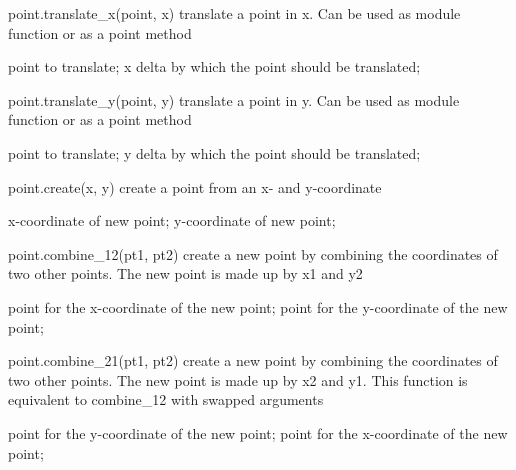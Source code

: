 \begin{APIfunc}{point.translate\_x(point, x)}
    translate a point in x. Can be used as module function or as a point method
    \begin{APIparameters}
            point to translate;
            x delta by which the point should be translated;
    \end{APIparameters}
\end{APIfunc}
\begin{APIfunc}{point.translate\_y(point, y)}
    translate a point in y. Can be used as module function or as a point method
    \begin{APIparameters}
            point to translate;
            y delta by which the point should be translated;
    \end{APIparameters}
\end{APIfunc}
\begin{APIfunc}{point.create(x, y)}
    create a point from an x- and y-coordinate
    \begin{APIparameters}
            x-coordinate of new point;
            y-coordinate of new point;
    \end{APIparameters}
\end{APIfunc}
\begin{APIfunc}{point.combine\_12(pt1, pt2)}
    create a new point by combining the coordinates of two other points. The new point is made up by x1 and y2
    \begin{APIparameters}
            point for the x-coordinate of the new point;
            point for the y-coordinate of the new point;
    \end{APIparameters}
\end{APIfunc}
\begin{APIfunc}{point.combine\_21(pt1, pt2)}
    create a new point by combining the coordinates of two other points. The new point is made up by x2 and y1. This function is equivalent to combine\_12 with swapped arguments
    \begin{APIparameters}
            point for the y-coordinate of the new point;
            point for the x-coordinate of the new point;
    \end{APIparameters}
\end{APIfunc}
